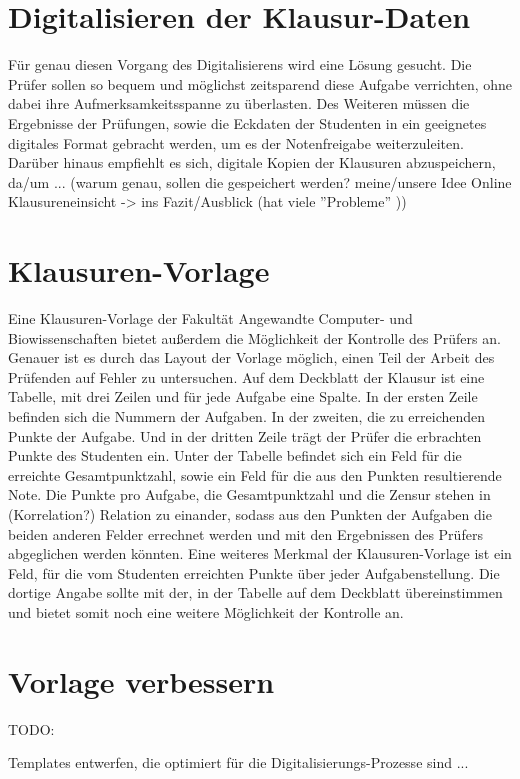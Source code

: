\documentclass[nomenclature, 150]{HSMW-Thesis}
\begin{document}
	\section{Digitalisieren der Klausur-Daten}
	Für genau diesen Vorgang des Digitalisierens wird eine Lösung gesucht. Die Prüfer sollen so bequem und möglichst zeitsparend diese Aufgabe verrichten, ohne dabei ihre Aufmerksamkeitsspanne zu überlasten. Des Weiteren müssen die Ergebnisse der Prüfungen, sowie die Eckdaten der Studenten in ein geeignetes digitales Format gebracht werden, um es der Notenfreigabe weiterzuleiten. Darüber hinaus empfiehlt es sich, digitale Kopien der Klausuren abzuspeichern, da/um ... (warum genau, sollen die gespeichert werden? meine/unsere Idee Online Klausureneinsicht -> ins Fazit/Ausblick (hat viele ''Probleme'' ))
	
	\section{Klausuren-Vorlage}
	Eine Klausuren-Vorlage der Fakultät Angewandte Computer- und Biowissenschaften bietet außerdem die Möglichkeit der Kontrolle des Prüfers an. Genauer ist es durch das Layout der Vorlage möglich, einen Teil der Arbeit des Prüfenden auf Fehler zu untersuchen. Auf dem Deckblatt der Klausur ist eine Tabelle, mit drei Zeilen und für jede Aufgabe eine Spalte. In der ersten Zeile befinden sich die Nummern der Aufgaben. In der zweiten, die zu erreichenden Punkte der Aufgabe. Und in der dritten Zeile trägt der Prüfer die erbrachten Punkte des Studenten ein. Unter der Tabelle befindet sich ein Feld für die erreichte Gesamtpunktzahl, sowie ein Feld für die aus den Punkten resultierende Note. Die Punkte pro Aufgabe, die Gesamtpunktzahl und die Zensur stehen in (Korrelation?) Relation zu einander, sodass aus den Punkten der Aufgaben die beiden anderen Felder errechnet werden und mit den Ergebnissen des Prüfers abgeglichen werden könnten. Eine weiteres Merkmal der Klausuren-Vorlage ist ein Feld, für die vom Studenten erreichten Punkte über jeder Aufgabenstellung. Die dortige Angabe sollte mit der, in der Tabelle auf dem Deckblatt übereinstimmen und bietet somit noch eine weitere Möglichkeit der Kontrolle an.
	
	\section{Vorlage verbessern}
	TODO:
	
	Templates entwerfen, die optimiert für die Digitalisierungs-Prozesse sind ... 
	
\end{document}
